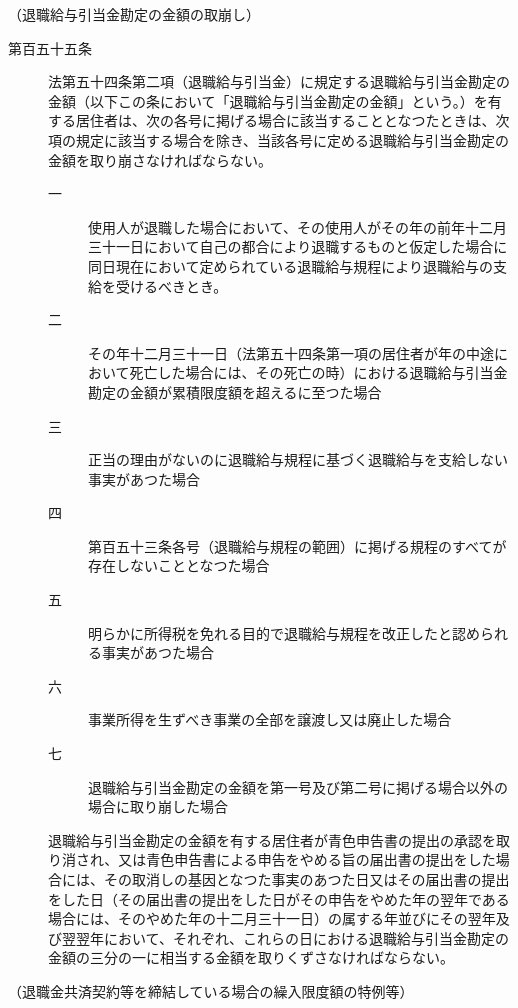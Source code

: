 \documentclass[twocolumn,a4j,10pt]{ltjtarticle}
\begin{document}
\noindent\hspace{10pt}（退職給与引当金勘定の金額の取崩し）
\begin{description}
\item[第百五十五条]法第五十四条第二項（退職給与引当金）に規定する退職給与引当金勘定の金額（以下この条において「退職給与引当金勘定の金額」という。）を有する居住者は、次の各号に掲げる場合に該当することとなつたときは、次項の規定に該当する場合を除き、当該各号に定める退職給与引当金勘定の金額を取り崩さなければならない。
\begin{description}
\item[一]使用人が退職した場合において、その使用人がその年の前年十二月三十一日において自己の都合により退職するものと仮定した場合に同日現在において定められている退職給与規程により退職給与の支給を受けるべきとき。
\item[二]その年十二月三十一日（法第五十四条第一項の居住者が年の中途において死亡した場合には、その死亡の時）における退職給与引当金勘定の金額が累積限度額を超えるに至つた場合
\item[三]正当の理由がないのに退職給与規程に基づく退職給与を支給しない事実があつた場合
\item[四]第百五十三条各号（退職給与規程の範囲）に掲げる規程のすべてが存在しないこととなつた場合
\item[五]明らかに所得税を免れる目的で退職給与規程を改正したと認められる事実があつた場合
\item[六]事業所得を生ずべき事業の全部を譲渡し又は廃止した場合
\item[七]退職給与引当金勘定の金額を第一号及び第二号に掲げる場合以外の場合に取り崩した場合
\end{description}
\item[]退職給与引当金勘定の金額を有する居住者が青色申告書の提出の承認を取り消され、又は青色申告書による申告をやめる旨の届出書の提出をした場合には、その取消しの基因となつた事実のあつた日又はその届出書の提出をした日（その届出書の提出をした日がその申告をやめた年の翌年である場合には、そのやめた年の十二月三十一日）の属する年並びにその翌年及び翌翌年において、それぞれ、これらの日における退職給与引当金勘定の金額の三分の一に相当する金額を取りくずさなければならない。
\end{description}
\noindent\hspace{10pt}（退職金共済契約等を締結している場合の繰入限度額の特例等）
\end{document}
